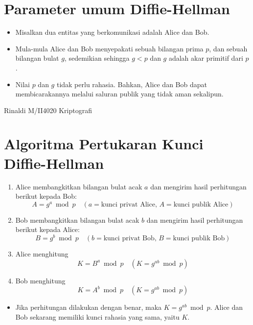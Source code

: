 \documentclass{article}
\begin{document}
\newpage


\section*{Parameter umum Diffie-Hellman}

\begin{itemize}
    \item Misalkan dua entitas yang berkomunikasi adalah Alice dan Bob.
    \item Mula-mula Alice dan Bob menyepakati sebuah bilangan prima $p$, dan sebuah bilangan bulat $g$, sedemikian sehingga $g < p$ dan $g$ adalah akar primitif dari $p$.
    \item Nilai $p$ dan $g$ tidak perlu rahasia. Bahkan, Alice dan Bob dapat membicarakannya melalui saluran publik yang tidak aman sekalipun.
\end{itemize}

\vspace{10mm}

\begin{center}
Rinaldi M/II4020 Kriptografi
\end{center}

\newpage


\section*{Algoritma Pertukaran Kunci Diffie-Hellman}

\begin{enumerate}
  \item Alice membangkitkan bilangan bulat acak $a$ dan mengirim hasil perhitungan berikut kepada Bob:
  \[ A = g^a \bmod p \quad (a = \text{kunci privat Alice, } A = \text{kunci publik Alice}) \]
  \item Bob membangkitkan bilangan bulat acak $b$ dan mengirim hasil perhitungan berikut kepada Alice:
  \[ B = g^b \bmod p \quad (b = \text{kunci privat Bob, } B = \text{kunci publik Bob}) \]
  \item Alice menghitung
  \[ K = B^a \bmod p \quad (K = g^{ab} \bmod p) \]
  \item Bob menghitung
  \[ K = A^b \bmod p \quad (K = g^{ab} \bmod p) \]
\end{enumerate}

\begin{itemize}
  \item Jika perhitungan dilakukan dengan benar, maka $K = g^{ab} \bmod p$. Alice dan Bob sekarang memiliki kunci rahasia yang sama, yaitu $K$.
\end{itemize}
\end{document}
